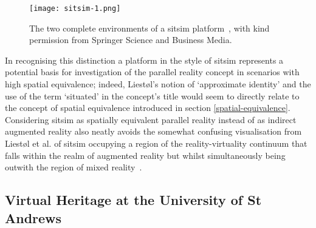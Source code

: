 \begin{figure}[h]
\centering
  \texttt{[image: sitsim-1.png]}
  \caption{The two complete environments of a sitsim platform~\cite{Liestøl2011}, with kind permission from Springer Science and Business Media.}
  \label{sitsim-1.png}
\end{figure}

In recognising this distinction a platform in the style of sitsim represents a potential basis for investigation of the parallel reality concept in scenarios with high spatial equivalence; indeed, Liest\o l's notion of `approximate identity' and the use of the term `situated' in the concept's title would seem to directly relate to the concept of spatial equivalence introduced in section \ref{spatial-equivalence}. Considering sitsim as spatially equivalent parallel reality instead of as indirect augmented reality also neatly avoids the somewhat confusing visualisation from Liest\o l et al. of sitsim occupying a region of the reality-virtuality continuum that falls within the realm of augmented reality but whilst simultaneously being outwith the region of mixed reality~\cite{Liestøl2011}.



\subsection{Virtual Heritage at the University of St Andrews}

\label{virtual-heritage-at-st-andrews}


